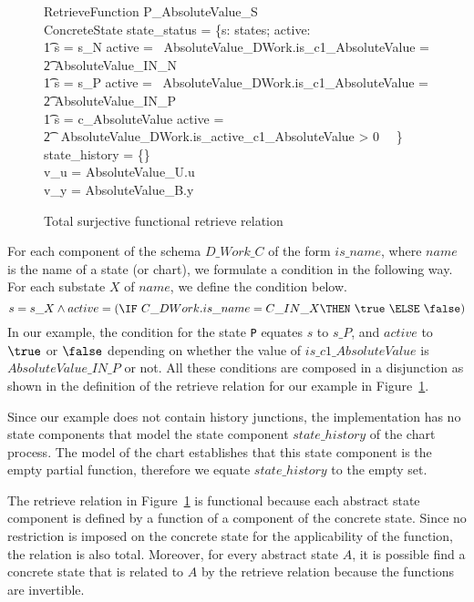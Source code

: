 \documentclass[submission]{eptcs}
\begin{document}
\begin{figure}
\begin{schema}{RetrieveFunction}
P\_AbsoluteValue\_S\\
ConcreteState
\where
state\_status = \{s: \dom states; active: \boolean \circspot\\\t1
s = s\_N \land active = \IF~AbsoluteValue\_DWork.is\_c1\_AbsoluteValue = \\
\t2 AbsoluteValue\_IN\_N \THEN \true \ELSE~\false \lor\\\t1
s = s\_P \land active = \IF~AbsoluteValue\_DWork.is\_c1\_AbsoluteValue =\\
\t2 AbsoluteValue\_IN\_P \THEN \true \ELSE~\false\lor\\\t1
s = c\_AbsoluteValue \land active =\\
\t2 \IF~AbsoluteValue\_DWork.is\_active\_c1\_AbsoluteValue > 0 \THEN~\true \ELSE~\false\}\\
state\_history = \{\}\\
v\_u = AbsoluteValue\_U.u\\
v\_y = AbsoluteValue\_B.y
\end{schema}
\caption{Total surjective functional retrieve relation}
\label{fig:retrieve}
\end{figure}

For each component of the schema $D\_Work\_C$ of the form $is\_name$, where $name$ is the name of a state (or chart), we formulate a condition in the following way. For each substate $X$ of $name$, we define the condition below.
\[s = s\_X \land active = (\IF~C\_DWork.is\_name = C\_IN\_X \THEN~\true~\ELSE~\false)\]
In our example, the condition for the state \texttt{P} equates $s$ to $s\_P$, and $active$ to $\true$ or $\false$ depending on whether the value of $is\_c1\_AbsoluteValue$ is $AbsoluteValue\_IN\_P$ or not. All these conditions are composed in a disjunction as shown in the definition of the retrieve relation for our example in Figure~\ref{fig:retrieve}.



Since our example does not contain history junctions, the implementation has no state components that model the state component $state\_history$ of the chart process. The model of the chart establishes that this state component is the empty partial function, therefore we equate $state\_history$ to the empty set.

The retrieve relation in Figure~\ref{fig:retrieve} is functional because each abstract state component is defined by a function of a component of the concrete state. Since no restriction is imposed on the concrete state for the applicability of the function, the relation is also total. Moreover, for every abstract state $A$, it is possible find a concrete state that is related to $A$ by the retrieve relation because the functions are invertible.
\end{document}
